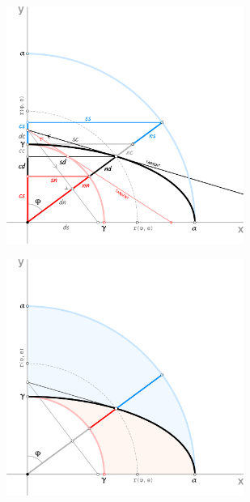 \documentclass[a4paper,10pt]{article}
\begin{document}
\begin{multicols}{2}
  \noindent
  \begin{minipage}{\linewidth}
    \centering
    \includegraphics[width=77.5mm]{./img/jacobiSine.png}\vspace{1mm}
    \label{fig:jacobi}
  \end{minipage}
  \noindent
  \begin{minipage}{\linewidth}
    \centering
    \includegraphics[width=77.5mm]{./img/dualTopology.png}\vspace{1mm}
    \label{fig:dual}
  \end{minipage}
\end{multicols}
\end{document}
